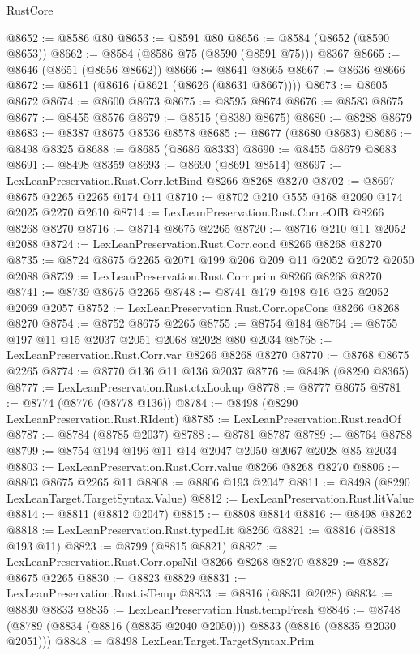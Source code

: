\begin{lexlean}{RustCore}
\begin{coremodule}
@8652 := @8586 @80
@8653 := @8591 @80
@8656 := @8584 (@8652 (@8590 @8653))
@8662 := @8584 (@8586 @75 (@8590 (@8591 @75))) @8367
@8665 := @8646 (@8651 (@8656 @8662))
@8666 := @8641 @8665
@8667 := @8636 @8666
@8672 := @8611 (@8616 (@8621 (@8626 (@8631 @8667))))
@8673 := @8605 @8672
@8674 := @8600 @8673
@8675 := @8595 @8674
@8676 := @8583 @8675
@8677 := @8455 @8576
@8679 := @8515 (@8380 @8675)
@8680 := @8288 @8679
@8683 := @8387 @8675 @8536 @8578
@8685 := @8677 (@8680 @8683)
@8686 := @8498 @8325
@8688 := @8685 (@8686 @8333)
@8690 := @8455 @8679 @8683
@8691 := @8498 @8359
@8693 := @8690 (@8691 @8514)
@8697 := LexLeanPreservation.Rust.Corr.letBind @8266 @8268 @8270
@8702 := @8697 @8675 @2265 @2265 @174 @11
@8710 := @8702 @210 @555 @168 @2090 @174 @2025 @2270 @2610
@8714 := LexLeanPreservation.Rust.Corr.eOfB @8266 @8268 @8270
@8716 := @8714 @8675 @2265
@8720 := @8716 @210 @11 @2052 @2088
@8724 := LexLeanPreservation.Rust.Corr.cond @8266 @8268 @8270
@8735 := @8724 @8675 @2265 @2071 @199 @206 @209 @11 @2052 @2072 @2050 @2088
@8739 := LexLeanPreservation.Rust.Corr.prim @8266 @8268 @8270
@8741 := @8739 @8675 @2265
@8748 := @8741 @179 @198 @16 @25 @2052 @2069 @2057
@8752 := LexLeanPreservation.Rust.Corr.opsCons @8266 @8268 @8270
@8754 := @8752 @8675 @2265
@8755 := @8754 @184
@8764 := @8755 @197 @11 @15 @2037 @2051 @2068 @2028 @80 @2034
@8768 := LexLeanPreservation.Rust.Corr.var @8266 @8268 @8270
@8770 := @8768 @8675 @2265
@8774 := @8770 @136 @11 @136 @2037
@8776 := @8498 (@8290 @8365)
@8777 := LexLeanPreservation.Rust.ctxLookup
@8778 := @8777 @8675
@8781 := @8774 (@8776 (@8778 @136))
@8784 := @8498 (@8290 LexLeanPreservation.Rust.RIdent)
@8785 := LexLeanPreservation.Rust.readOf
@8787 := @8784 (@8785 @2037)
@8788 := @8781 @8787
@8789 := @8764 @8788
@8799 := @8754 @194 @196 @11 @14 @2047 @2050 @2067 @2028 @85 @2034
@8803 := LexLeanPreservation.Rust.Corr.value @8266 @8268 @8270
@8806 := @8803 @8675 @2265 @11
@8808 := @8806 @193 @2047
@8811 := @8498 (@8290 LexLeanTarget.TargetSyntax.Value)
@8812 := LexLeanPreservation.Rust.litValue
@8814 := @8811 (@8812 @2047)
@8815 := @8808 @8814
@8816 := @8498 @8262
@8818 := LexLeanPreservation.Rust.typedLit @8266
@8821 := @8816 (@8818 @193 @11)
@8823 := @8799 (@8815 @8821)
@8827 := LexLeanPreservation.Rust.Corr.opsNil @8266 @8268 @8270
@8829 := @8827 @8675 @2265
@8830 := @8823 @8829
@8831 := LexLeanPreservation.Rust.isTemp
@8833 := @8816 (@8831 @2028)
@8834 := @8830 @8833
@8835 := LexLeanPreservation.Rust.tempFresh
@8846 := @8748 (@8789 (@8834 (@8816 (@8835 @2040 @2050))) @8833 (@8816 (@8835 @2030 @2051)))
@8848 := @8498 LexLeanTarget.TargetSyntax.Prim

\end{coremodule}
\end{lexlean}

